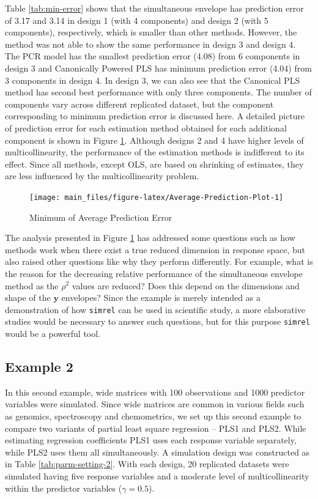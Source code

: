 \documentclass[review]{elsarticle}
\theoremstyle{definition}
\theoremstyle{definition}
\theoremstyle{definition}
\theoremstyle{remark}
\begin{document}
Table \ref{tab:min-error} shows that the simultaneous envelope has
prediction error of 3.17 and 3.14 in design 1 (with 4 components) and
design 2 (with 5 components), respectively, which is smaller than other
methods. However, the method was not able to show the same performance
in design 3 and design 4. The PCR model has the smallest prediction
error (4.08) from 6 components in design 3 and Canonically Powered PLS
has minimum prediction error (4.04) from 3 components in design 4. In
design 3, we can also see that the Canonical PLS method has second best
performance with only three components. The number of components vary
across different replicated dataset, but the component corresponding to
minimum prediction error is discussed here. A detailed picture of
prediction error for each estimation method obtained for each additional
component is shown in Figure \ref{fig:Average-Prediction-Plot}. Although
designs 2 and 4 have higher levels of multicollinearity, the performance
of the estimation methods is indifferent to its effect. Since all
methods, except OLS, are based on shrinking of estimates, they are less
influenced by the multicollinearity problem.

\begin{figure}[!htb]
\texttt{[image: main\_files/figure-latex/Average-Prediction-Plot-1]} \caption{Minimum of Average Prediction Error}\label{fig:Average-Prediction-Plot}
\end{figure}

The analysis presented in Figure \ref{fig:Average-Prediction-Plot} has
addressed some questions such as how methods work when there exist a
true reduced dimension in response space, but also raised other
questions like why they perform differently. For example, what is the
reason for the decreasing relative performance of the simultaneous
envelope method as the \(\rho^2\) values are reduced? Does this depend
on the dimensions and shape of the \(\mathbf{y}\) envelopes? Since the
example is merely intended as a demonstration of how \texttt{simrel} can
be used in scientific study, a more elaborative studies would be
necessary to answer such questions, but for this purpose \texttt{simrel}
would be a powerful tool.

\subsection{Example 2}\label{example-2}

In this second example, wide matrices with 100 observations and 1000
predictor variables were simulated. Since wide matrices are common in
various fields such as genomics, spectroscopy and chemometrics, we set
up this second example to compare two variants of partial least square
regression -- PLS1 and PLS2. While estimating regression coefficients
PLS1 uses each response variable separately, while PLS2 uses them all
simultaneously. A simulation design was constructed as in Table
\ref{tab:parm-setting-2}. With each design, 20 replicated datasets were
simulated having five response variables and a moderate level of
multicollinearity within the predictor variables (\(\gamma = 0.5\)).
\end{document}
